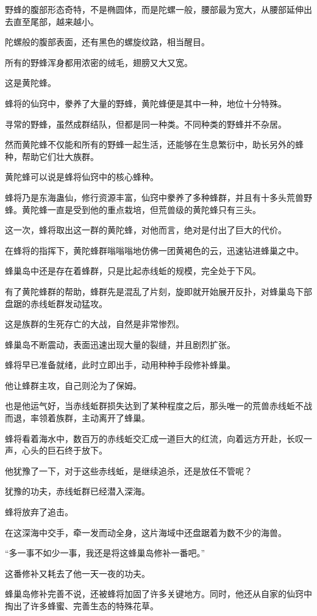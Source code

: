 \begin{this_body}
野蜂的腹部形态奇特，不是椭圆体，而是陀螺一般，腰部最为宽大，从腰部延伸出去直至尾部，越来越小。

陀螺般的腹部表面，还有黑色的螺旋纹路，相当醒目。

所有的野蜂浑身都用浓密的绒毛，翅膀又大又宽。

这是黄陀蜂。

蜂将的仙窍中，豢养了大量的野蜂，黄陀蜂便是其中一种，地位十分特殊。

寻常的野蜂，虽然成群结队，但都是同一种类。不同种类的野蜂并不杂居。

然而黄陀蜂不仅能和所有的野蜂一起生活，还能够在生息繁衍中，助长另外的蜂种，帮助它们壮大族群。

黄陀蜂可以说是蜂将仙窍中的核心蜂种。

蜂将乃是东海蛊仙，修行资源丰富，仙窍中豢养了多种蜂群，并且有十多头荒兽野蜂。黄陀蜂一直是受到他的重点栽培，但荒兽级的黄陀蜂只有三头。

这一次，蜂将取出这一群的黄陀蜂，对他而言，绝对是付出了巨大的代价。

在蜂将的指挥下，黄陀蜂群嗡嗡嗡地仿佛一团黄褐色的云，迅速钻进蜂巢之中。

蜂巢岛中还是存在着蜂群，只是比起赤线蚯的规模，完全处于下风。

有了黄陀蜂群的帮助，蜂群先是混乱了片刻，旋即就开始展开反扑，对蜂巢岛下部盘踞的赤线蚯群发动猛攻。

这是族群的生死存亡的大战，自然是非常惨烈。

蜂巢岛不断震动，表面迅速出现大量的裂缝，并且剧烈扩张。

蜂将早已准备就绪，此时立即出手，动用种种手段修补蜂巢。

他让蜂群主攻，自己则沦为了保姆。

也是他运气好，当赤线蚯群损失达到了某种程度之后，那头唯一的荒兽赤线蚯不战而退，率领着族群，主动离开了蜂巢。

蜂将看着海水中，数百万的赤线蚯交汇成一道巨大的红流，向着远方开赴，长叹一声，心头的巨石终于放下。

他犹豫了一下，对于这些赤线蚯，是继续追杀，还是放任不管呢？

犹豫的功夫，赤线蚯群已经潜入深海。

蜂将放弃了追击。

在这深海中交手，牵一发而动全身，这片海域中还盘踞着为数不少的海兽。

“多一事不如少一事，我还是将这蜂巢岛修补一番吧。”

这番修补又耗去了他一天一夜的功夫。

蜂巢岛修补完善不说，还被蜂将加固了许多关键地方。同时，他还从自家的仙窍中掏出了许多蜂蜜、完善生态的特殊花草。


\end{this_body}
